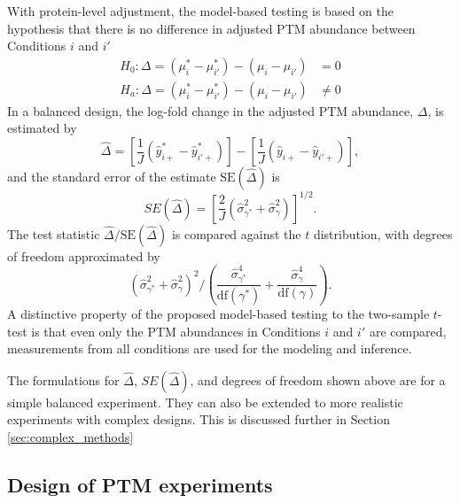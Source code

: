 \documentclass{mcp}
\begin{document}
With protein-level adjustment, the model-based testing is based on the hypothesis that there is no difference in adjusted PTM abundance between Conditions $i$ and $i'$
\begin{align*}
H_{0}: \Delta = \left( \mu_{i}^{\ast} - \mu_{i'}^{\ast} \right) - \left( \mu_{i} - \mu_{i'} \right) &= 0 \\
H_{a}: \Delta = \left( \mu_{i}^{\ast} - \mu_{i'}^{\ast} \right) - \left( \mu_{i} - \mu_{i'} \right) &\neq 0
\end{align*}
In a balanced design, the log-fold change in the adjusted PTM abundance, $\Delta$, is estimated by 
\[
\hat{\Delta} = \left[ \frac{1}{J} \left( \hat{y}_{i+}^{\ast} - \hat{y}_{i'+}^{\ast} \right) \right] - \left[ \frac{1}{J} \left( \hat{y}_{i+} - \hat{y}_{i'+} \right) \right],
\]
and the standard error of the estimate $\mathrm{SE}(\hat{\Delta})$ is 
\[
SE(\hat{\Delta}) = \left[ \frac{2}{J} \left( \hat{\sigma}_{\gamma^{\ast}}^{2} + \hat{\sigma}_{\gamma}^{2} \right) \right]^{1/2}.
\]
The test statistic $\hat{\Delta} / \mathrm{SE}(\hat{\Delta})$ is compared against the $t$ distribution, with degrees of freedom approximated by
\[
\left( \hat{\sigma}_{\gamma^{\ast}}^{2} + \hat{\sigma}_{\gamma}^{2} \right)^2 \bigg/
\left( \frac{\hat{\sigma}_{\gamma^{\ast}}^{4}}{\mathrm{df}(\gamma^{\ast})} + \frac{\hat{\sigma}_{\gamma}^{4}}{ \mathrm{df}(\gamma)} \right).
\]
A distinctive property of the proposed model-based testing to the two-sample $t$-test is that even only the PTM abundances in Conditions $i$ and $i'$ are compared, measurements from all conditions are used for the modeling and inference.

The formulations for $\hat{\Delta}$, $SE(\hat{\Delta})$, and degrees of freedom shown above are for a simple balanced experiment. They can also be extended to more realistic experiments with complex designs. This is discussed further in Section \ref{sec:complex_methods}


\subsection{Design of PTM experiments}
\label{sec:design}
\end{document}
